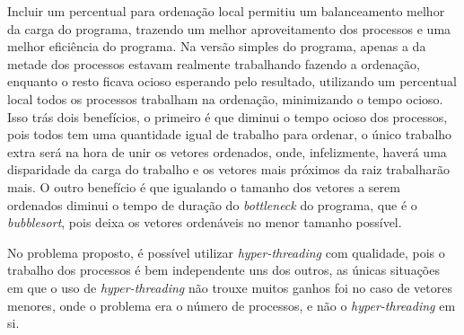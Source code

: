 



Incluir um percentual para ordenação local permitiu um balanceamento melhor da carga do programa,
trazendo um melhor aproveitamento dos processos e uma melhor eficiência do programa. Na versão
simples do programa, apenas a da metade dos processos estavam realmente trabalhando fazendo a
ordenação, enquanto o resto ficava ocioso esperando pelo resultado, utilizando um percentual local
todos os processos trabalham na ordenação, minimizando o tempo ocioso. Isso trás dois benefícios, o
primeiro é que diminui o tempo ocioso dos processos, pois todos tem uma quantidade igual de trabalho
para ordenar, o único trabalho extra será na hora de unir os vetores ordenados, onde, infelizmente,
haverá uma disparidade da carga do trabalho e os vetores mais próximos da raiz trabalharão mais. O
outro benefício é que igualando o tamanho dos vetores a serem ordenados diminui o tempo de duração
do \emph{bottleneck} do programa, que é o \emph{bubblesort}, pois deixa os vetores ordenáveis no
menor tamanho possível.

No problema proposto, é possível utilizar \emph{hyper-threading} com qualidade, pois o trabalho dos processos é bem independente uns dos outros, as únicas situações em que o uso de \emph{hyper-threading} não trouxe muitos ganhos foi no caso de vetores menores, onde o problema era o número de processos, e não o \emph{hyper-threading} em si.
